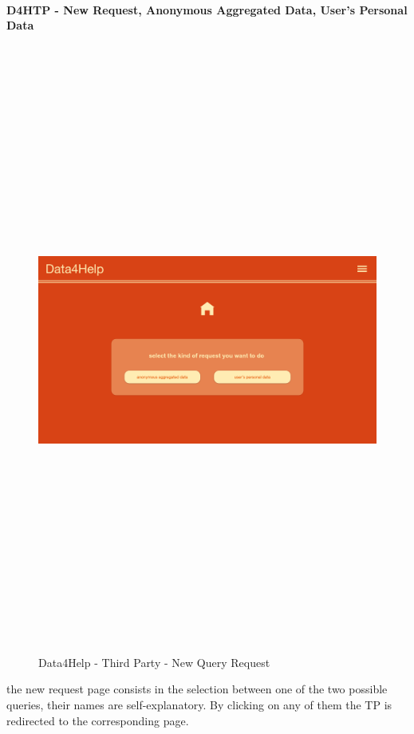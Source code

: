 \paragraph{D4HTP - New Request, Anonymous Aggregated Data, User's Personal Data}
\begin{figure}[H]
    \includegraphics[width=.6\linewidth, height = 20cm, keepaspectratio]{./Images/Mockups/Data4Help/D4HTP/D4HTP_NewQueryRequest.png}
    \centering
    \caption{Data4Help - Third Party - New Query Request}
    \label{fig:sab}
  \end{figure}

the new request page consists in the selection between one of the two possible queries, their names are self-explanatory. 
By clicking on any of them the TP is redirected to the corresponding page.


